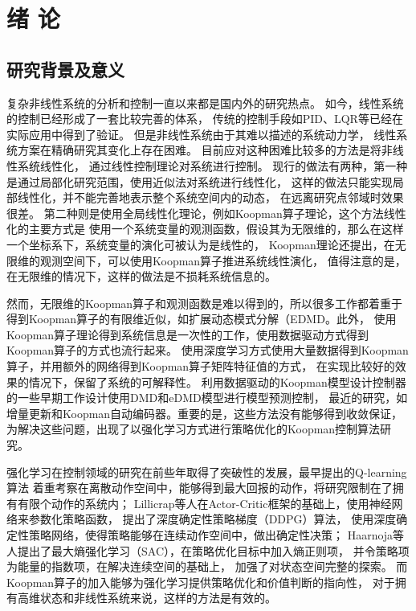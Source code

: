 \documentclass[AutoFakeBold]{LZUThesis}
\begin{document}
\mainmatter

\chapter{\texorpdfstring{绪 \quad 论}{绪论}}

\section{研究背景及意义}
复杂非线性系统的分析和控制一直以来都是国内外的研究热点。
如今，线性系统的控制已经形成了一套比较完善的体系，
传统的控制手段如PID、LQR等已经在实际应用中得到了验证。
但是非线性系统由于其难以描述的系统动力学，
线性系统方案在精确研究其变化上存在困难。
目前应对这种困难比较多的方法是将非线性系统线性化，
通过线性控制理论对系统进行控制。
现行的做法有两种，第一种是通过局部化研究范围，使用近似法对系统进行线性化，
这样的做法只能实现局部线性化，并不能完善地表示整个系统空间内的动态，
在远离研究点邻域时效果很差。
第二种则是使用全局线性化理论，例如Koopman算子理论，这个方法线性化的主要方式是
使用一个系统变量的观测函数，假设其为无限维的，那么在这样一个坐标系下，系统变量的演化可被认为是线性的，
Koopman理论还提出，在无限维的观测空间下，可以使用Koopman算子推进系统线性演化，
值得注意的是，在无限维的情况下，这样的做法是不损耗系统信息的。

然而，无限维的Koopman算子和观测函数是难以得到的，所以很多工作都着重于
得到Koopman算子的有限维近似，如扩展动态模式分解（EDMD。此外，
使用Koopman算子理论得到系统信息是一次性的工作，使用数据驱动方式得到Koopman算子的方式也流行起来。
使用深度学习方式使用大量数据得到Koopman算子，并用额外的网络得到Koopman算子矩阵特征值的方式\cite{lusch_deep_2018}，
在实现比较好的效果的情况下，保留了系统的可解释性。
利用数据驱动的Koopman模型设计控制器的一些早期工作设计使用DMD和eDMD模型进行模型预测控制\cite{kaiser_data-driven_2021}，
最近的研究，如增量更新\cite{calderon_koopman_2021}和Koopman自动编码器\cite{retchin_koopman_2023}。重要的是，这些方法没有能够得到收敛保证，
为解决这些问题，出现了以强化学习方式进行策略优化的Koopman控制算法研究\cite{karl}。

强化学习在控制领域的研究在前些年取得了突破性的发展，最早提出的Q-learning算法
着重考察在离散动作空间中，能够得到最大回报的动作，将研究限制在了拥有有限个动作的系统内；
Lillicrap等人\cite{lillicrap_continuous_2019}在Actor-Critic框架的基础上，使用神经网络来参数化策略函数，
提出了深度确定性策略梯度（DDPG）算法，
使用深度确定性策略网络，使得策略能够在连续动作空间中，做出确定性决策；
Haarnoja等人\cite{haarnoja_soft_2018}提出了最大熵强化学习（SAC），在策略优化目标中加入熵正则项，
并令策略项为能量的指数项，在解决连续空间的基础上，
加强了对状态空间完整的探索。
而Koopman算子的加入能够为强化学习提供策略优化和价值判断的指向性，
对于拥有高维状态和非线性系统来说，这样的方法是有效的。
\end{document}
